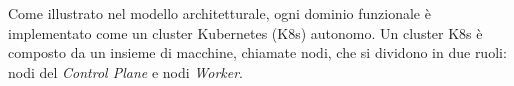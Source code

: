 




Come illustrato nel modello architetturale, ogni dominio funzionale è implementato come un cluster Kubernetes (K8s) autonomo. Un cluster K8s è composto da un insieme di macchine, chiamate nodi, che si dividono in due ruoli: nodi del \textit{Control Plane} e nodi \textit{Worker}.



